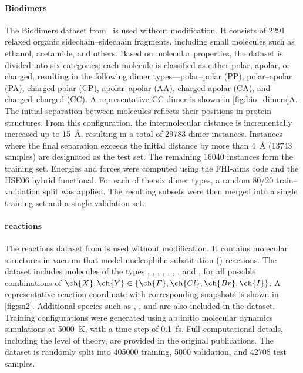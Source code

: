 \documentclass[10pt]{article}
\begin{document}
\paragraph{Biodimers}
The Biodimers dataset from~\cite{hlhc2023, burns2017biofragment} is used without modification. It consists of \num{2291} relaxed organic sidechain–sidechain fragments, including small molecules such as ethanol, acetamide, and others.
%
Based on molecular properties, the dataset is divided into six categories: each molecule is classified as either polar, apolar, or charged, resulting in the following dimer types—polar–polar (PP), polar–apolar (PA), charged-polar (CP), apolar–apolar (AA), charged-apolar (CA), and charged–charged (CC). A representative CC dimer is shown in \cref{fig:bio_dimers}A.
%
The initial separation between molecules reflects their positions in protein structures. From this configuration, the intermolecular distance is incrementally increased up to \qty{15}{\angstrom}, resulting in a total of \num{29783} dimer instances.
%
Instances where the final separation exceeds the initial distance by more than \qty{4}{\angstrom} (\num{13743} samples) are designated as the test set. The remaining \num{16040} instances form the training set. Energies and forces were computed using the FHI-aims code and the HSE06 hybrid functional. For each of the six dimer types, a random \num{80}/\num{20} train–validation split was applied. The resulting subsets were then merged into a single training set and a single validation set.

\paragraph{\sn reactions}
The \sn reactions dataset from \cite{um2019, fcmu2024} is used without modification. It contains molecular structures in vacuum that model nucleophilic substitution (\sn) reactions. The dataset includes molecules of the types , , , , , , , and , for all possible combinations of \( \ch{X}, \ch{Y} \in \{\ch{F}, \ch{Cl}, \ch{Br}, \ch{I}\} \). A representative reaction coordinate with corresponding snapshots is shown in \cref{fig:sn2}. Additional species such as , , and  are also included in the dataset.
%
Training configurations were generated using ab initio molecular dynamics simulations at \qty{5000}{\kelvin}, with a time step of \qty{0.1}{\femto\second}. Full computational details, including the level of theory, are provided in the original publications. The dataset is randomly split into \num{405000} training, \num{5000} validation, and \num{42708} test samples.
\end{document}
